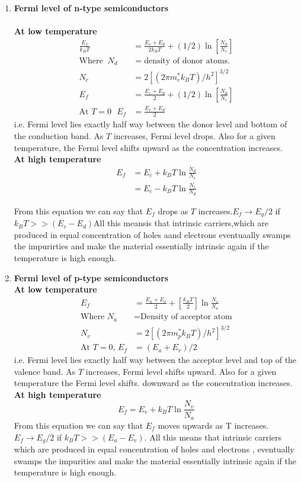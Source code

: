 \begin{enumerate}
	\item \textbf{Fermi level of n-type semiconductors }\\\\
	\textbf{At low temperature}\\
	\begin{align*}
	\frac{E_{f}}{k_{B} T}&=\frac{E_{c}+E_{d}}{2 k_{B} T}+(1 / 2) \ln \left[\frac{N_{d}}{N_{c}}\right]\\
	\text{Where }\ N_d&= \text{density of donor atoms}.\\
	N_c&=2\left[ (2\pi m_e^* k_BT)/h^2\right] ^{3/2}\\
	E_f&=\frac{E_{c}+E_{d}}{2}+(1 / 2) \ln \left[\frac{N_{d}}{N_{c}}\right]\\
	\text{At $T=0 $ } E_f&=\frac{E_c+E_d}{2}
	\end{align*}
	i.e. Fermi level lies exactly half way between the donor level and bottom of the conduction band. As $T$ increases, Fermi level drops. Also for a given temperature, the Fermi level shifts upward as the concentration increases.\\
	\textbf{At high temperature}\\
	\begin{align*}
	E_{f}&=E_{c}+k_{B} T \ln \frac{N_{d}}{N_{c}}\\&=E_{c}-k_{B} T \ln \frac{N_{c}}{N_{d}}
	\end{align*}
	
	From this equation we can say that $E_f$ drops as $T$ increases.$E_f\rightarrow E_g/2$ if $k_BT>>(E_c-E_d)$All this meansis that intrinsic carriers,which are produced in equal concentration of holes aand electrons eventuaally swamps the impurirties and make the material essentially intrinsic again if the temperature is high enough.
	\item \textbf{Fermi level of p-type semiconductors}\\
	\textbf{At low temperature}\\
	\begin{align*}
	E_f&=\frac{E_{a}+E_{v}}{2}+\left[\frac{k_{B} T}{2}\right] \ln \frac{N_{v}}{N_{a}}\\
	\text{Where } N_a&= \text{Density of acceptor atom}\\
   N_v&=2\left[ (2\pi m_p^* k_BT)/h^2\right] ^{3/2}\\
	\text{At $T=0$, } E_{f}&=\left(E_{a}+E_{v}\right) / 2
	\end{align*}
	i.e. Fermi level lies exactly half way between the acceptor level and top of the valence band. As $T$ increases, Fermi level shifts upward. Also for a given temperature the Fermi level shifts. downward as the concentration increases.\\
	\textbf{At high temperature} \\
	$$E_{f}=E_{v}+k_{B} T \ln \frac{N_{v}}{N_{a}}$$
	From this equation we can say that $E_f$ moves upwards as T increases.$E_f\rightarrow E_g/2$ if $ k_BT>>(E_a-E_v)$. All this means that intrinsic carriers which are produced in equal concentration of holes and electrons , eventually swamps the impurities and make the material essentially intrinsic again if the temperature is high enough.
\end{enumerate}

